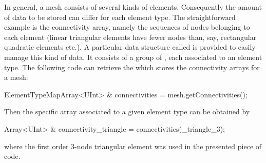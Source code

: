 In general, a mesh consists of several kinds of elements.
Consequently the amount of data to be stored can differ for each element type.
The straightforward example is the connectivity array, namely the sequences of nodes belonging to each element (linear triangular elements have fewer nodes than, say, rectangular quadratic elements etc.).
A particular data structure called  is provided to easily manage this kind of data.
It consists of a group of , each associated to an element type.
The following code can retrieve the  which stores the connectivity arrays for a mesh:
\begin{cpp}
  ElementTypeMapArray<UInt> & connectivities = mesh.getConnectivities();
\end{cpp}
Then the specific array associated to a given element type can be obtained by
\begin{cpp}
  Array<UInt> & connectivity_triangle = connectivities(_triangle_3);
\end{cpp}
where the first order 3-node triangular element was used in the presented piece
of code.

